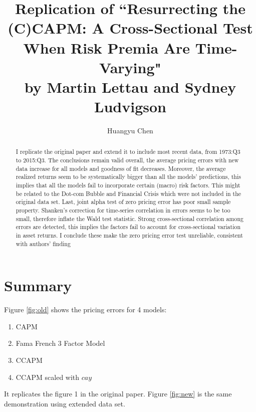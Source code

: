\documentclass[12pt]{article}
\begin{document}
\title{Replication of ``Resurrecting the (C)CAPM: A Cross-Sectional Test When Risk Premia Are Time-Varying" \\by  Martin Lettau and Sydney Ludvigson}
\author{Huangyu Chen}
\maketitle

\begin{abstract}
 I replicate the original paper and extend it to include most recent data,  from 1973:Q3 to 2015:Q3. The conclusions remain valid overall, the average pricing errors with new data increase for all models and goodness of fit decreases. Moreover, the average realized returns seem to be systematically bigger than all the models' predictions, this implies that all the models fail to incorporate certain (macro) risk factors. This might be related to the Dot-com Bubble and Financial Crisis which were not included in the original data set.  Last, joint alpha test of zero pricing error has poor small sample property. Shanken's correction for time-series correlation in errors seems to be too small, therefore inflate the Wald test statistic. Strong cross-sectional correlation among errors are detected, this implies the factors fail to account for cross-sectional variation in asset returns. I conclude these make the zero pricing error test unreliable, consistent with authors' finding
\end{abstract}
\section{Summary}
Figure \ref{fig:old} shows the pricing errors for 4 models: 
\begin{enumerate}
 \item CAPM
 \item Fama French 3 Factor Model 
 \item CCAPM
 \item CCAPM scaled with $cay$
\end{enumerate}
It replicates the figure 1 in the original paper. Figure \ref{fig:new} is the same demonstration using extended data set. 
\end{document}
